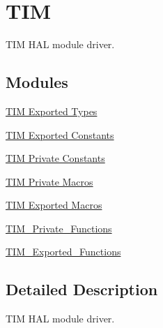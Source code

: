 \hypertarget{group___t_i_m}{}\section{T\+IM}
\label{group___t_i_m}


T\+IM H\+AL module driver.  


\subsection*{Modules}
\begin{DoxyCompactItemize}
\item 
\hyperlink{group___t_i_m___exported___types}{T\+I\+M Exported Types}
\item 
\hyperlink{group___t_i_m___exported___constants}{T\+I\+M Exported Constants}
\item 
\hyperlink{group___t_i_m___private___constants}{T\+I\+M Private Constants}
\item 
\hyperlink{group___t_i_m___private___macros}{T\+I\+M Private Macros}
\item 
\hyperlink{group___t_i_m___exported___macros}{T\+I\+M Exported Macros}
\item 
\hyperlink{group___t_i_m___private___functions}{T\+I\+M\+\_\+\+Private\+\_\+\+Functions}
\item 
\hyperlink{group___t_i_m___exported___functions}{T\+I\+M\+\_\+\+Exported\+\_\+\+Functions}
\end{DoxyCompactItemize}


\subsection{Detailed Description}
T\+IM H\+AL module driver. 

